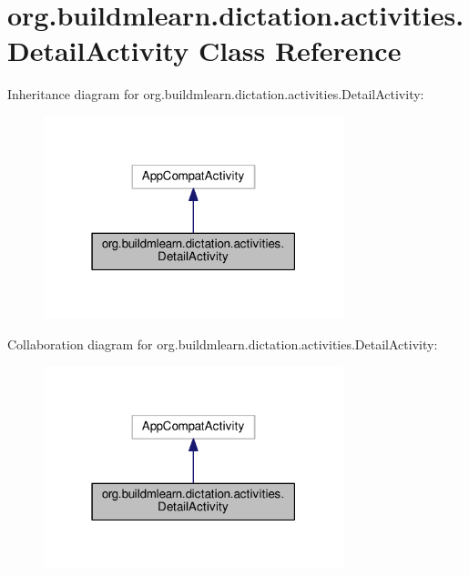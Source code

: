 \hypertarget{classorg_1_1buildmlearn_1_1dictation_1_1activities_1_1DetailActivity}{}\section{org.\+buildmlearn.\+dictation.\+activities.\+Detail\+Activity Class Reference}
\label{classorg_1_1buildmlearn_1_1dictation_1_1activities_1_1DetailActivity}


Inheritance diagram for org.\+buildmlearn.\+dictation.\+activities.\+Detail\+Activity\+:
\nopagebreak
\begin{figure}[H]
\begin{center}
\leavevmode
\includegraphics[width=247pt]{classorg_1_1buildmlearn_1_1dictation_1_1activities_1_1DetailActivity__inherit__graph}
\end{center}
\end{figure}


Collaboration diagram for org.\+buildmlearn.\+dictation.\+activities.\+Detail\+Activity\+:
\nopagebreak
\begin{figure}[H]
\begin{center}
\leavevmode
\includegraphics[width=247pt]{classorg_1_1buildmlearn_1_1dictation_1_1activities_1_1DetailActivity__coll__graph}
\end{center}
\end{figure}
